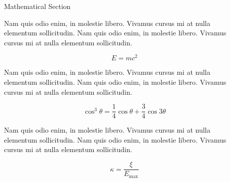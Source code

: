 \documentclass[final]{beamer}
\newlength{\onecolwid}
\newlength{\twocolwid}
\begin{document}
\begin{frame}[t]
\begin{columns}[t]
\begin{column}{\twocolwid}
\begin{columns}[t,totalwidth=\twocolwid] %

\begin{column}{\onecolwid} %


\begin{block}{Mathematical Section}

Nam quis odio enim, in molestie libero. Vivamus cursus mi at nulla elementum sollicitudin. Nam quis odio enim, in molestie libero. Vivamus cursus mi at nulla elementum sollicitudin.
  
\begin{equation}
E = mc^{2}
\label{eqn:Einstein}
\end{equation}

Nam quis odio enim, in molestie libero. Vivamus cursus mi at nulla elementum sollicitudin. Nam quis odio enim, in molestie libero. Vivamus cursus mi at nulla elementum sollicitudin.

\begin{equation}
\cos^3 \theta =\frac{1}{4}\cos\theta+\frac{3}{4}\cos 3\theta
\label{eq:refname}
\end{equation}

Nam quis odio enim, in molestie libero. Vivamus cursus mi at nulla elementum sollicitudin. Nam quis odio enim, in molestie libero. Vivamus cursus mi at nulla elementum sollicitudin.

\begin{equation}
\kappa =\frac{\xi}{E_{\mathrm{max}}} %
\end{equation}

\end{block}


\end{column} %

\begin{column}{\onecolwid} %



\end{column}
\end{columns}
\end{column}
\end{columns}
\end{frame}
\end{document}
